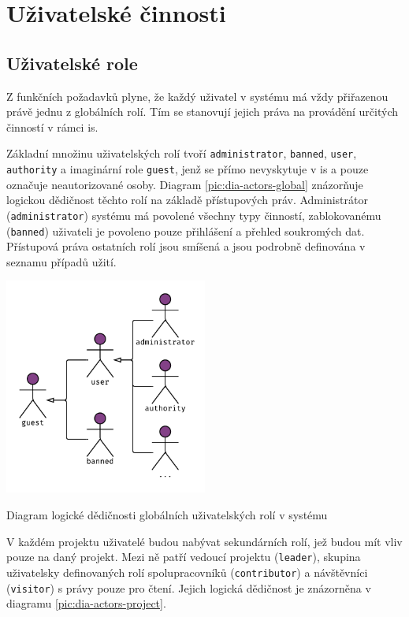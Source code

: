 \section{Uživatelské činnosti}

\subsection{Uživatelské role}

Z funkčních požadavků plyne, že každý uživatel v systému má vždy přiřazenou právě jednu z globálních rolí. Tím se stanovují jejich práva na provádění určitých činností v rámci \gls{is}.

Základní množinu uživatelských rolí tvoří \texttt{administrator}, \texttt{banned}, \texttt{user}, \texttt{authority} a imaginární role \texttt{guest}, jenž se přímo nevyskytuje v \gls{is} a pouze označuje neautorizované osoby. Diagram \ref{pic:dia-actors-global} znázorňuje logickou dědičnost těchto rolí na základě přístupových práv. Administrátor (\texttt{administrator}) systému má povolené všechny typy činností, zablokovanému (\texttt{banned}) uživateli je povoleno pouze přihlášení a přehled soukromých dat. Přístupová práva ostatních rolí jsou smíšená a jsou podrobně definována v seznamu případů užití.


\begin{fig:illustration}
   \includegraphics[width=0.5\textwidth]{images/dia-actors-global.pdf}
   \caption{Diagram logické dědičnosti globálních uživatelských rolí v systému}\label{pic:dia-actors-global}
\end{fig:illustration}


V každém projektu uživatelé budou nabývat sekundárních rolí, jež budou mít vliv pouze na daný projekt. Mezi ně patří vedoucí projektu (\texttt{leader}), skupina uživatelsky definovaných rolí spolupracovníků (\texttt{contributor}) a návštěvníci (\texttt{visitor}) s právy pouze pro čtení. Jejich logická dědičnost je znázorněna v diagramu \ref{pic:dia-actors-project}.


